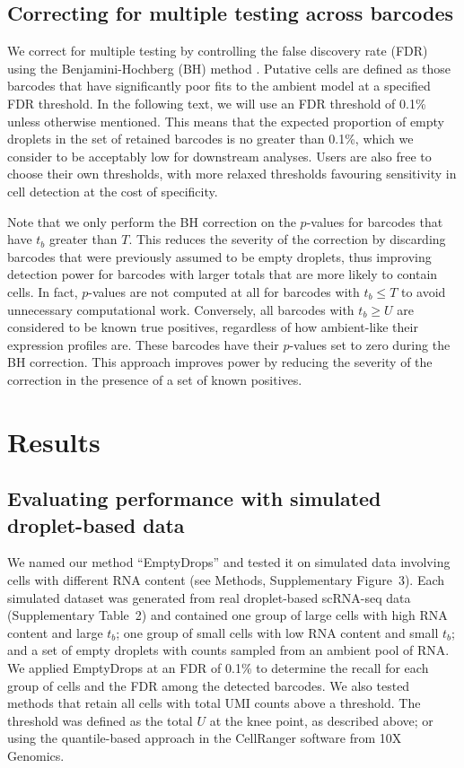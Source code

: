 \documentclass[10pt,letterpaper]{article}
\newcommand{\supptabdataset}{2}
\newcommand{\suppfigsimdesign}{3}
\begin{document}
\subsection*{Correcting for multiple testing across barcodes}
We correct for multiple testing by controlling the false discovery rate (FDR) using the Benjamini-Hochberg (BH) method \cite{benjamini1995controlling}.
Putative cells are defined as those barcodes that have significantly poor fits to the ambient model at a specified FDR threshold.
In the following text, we will use an FDR threshold of 0.1\% unless otherwise mentioned.
This means that the expected proportion of empty droplets in the set of retained barcodes is no greater than 0.1\%,
which we consider to be acceptably low for downstream analyses.
Users are also free to choose their own thresholds, with more relaxed thresholds favouring sensitivity in cell detection at the cost of specificity.

Note that we only perform the BH correction on the $p$-values for barcodes that have $t_b$ greater than $T$.
This reduces the severity of the correction by discarding barcodes that were previously assumed to be empty droplets, thus improving detection power for barcodes with larger totals that are more likely to contain cells.
In fact, $p$-values are not computed at all for barcodes with $t_b \le T$ to avoid unnecessary computational work.
Conversely, all barcodes with $t_b \ge U$ are considered to be known true positives, regardless of how ambient-like their expression profiles are.
These barcodes have their $p$-values set to zero during the BH correction.
This approach improves power by reducing the severity of the correction in the presence of a set of known positives.

\section*{Results}

\subsection*{Evaluating performance with simulated droplet-based data}
We named our method ``EmptyDrops'' and tested it on simulated data involving cells with different RNA content (see Methods, Supplementary Figure~\suppfigsimdesign{}).
Each simulated dataset was generated from real droplet-based scRNA-seq data (Supplementary Table~\supptabdataset{}) 
and contained one group of large cells with high RNA content and large $t_b$;
one group of small cells with low RNA content and small $t_b$; 
and a set of empty droplets with counts sampled from an ambient pool of RNA.
We applied EmptyDrops at an FDR of 0.1\% to determine the recall for each group of cells and the FDR among the detected barcodes.
We also tested methods that retain all cells with total UMI counts above a threshold.
The threshold was defined as the total $U$ at the knee point, as described above;
or using the quantile-based approach \cite{zheng2017massively} in the CellRanger software from 10X Genomics.
\end{document}
